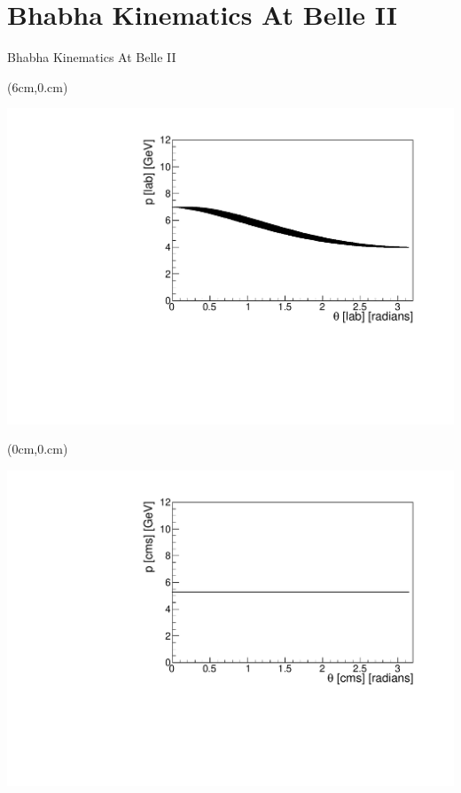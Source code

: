 \documentclass[8pt]{beamer}
\begin{document}
\section{Bhabha Kinematics At Belle II}

\begin{frame}{Bhabha Kinematics At Belle II}
	
	
	

	
	\begin{textblock*}{5.5cm}(6cm,0.cm)
		
		\includegraphics[width=\textwidth]{VBilder/theta_lab}
	\end{textblock*}

	\begin{textblock*}{5.5cm}(0cm,0.cm)
	
	\includegraphics[width=\textwidth]{VBilder/theta_cms}
\end{textblock*}



\end{frame}
\end{document}
